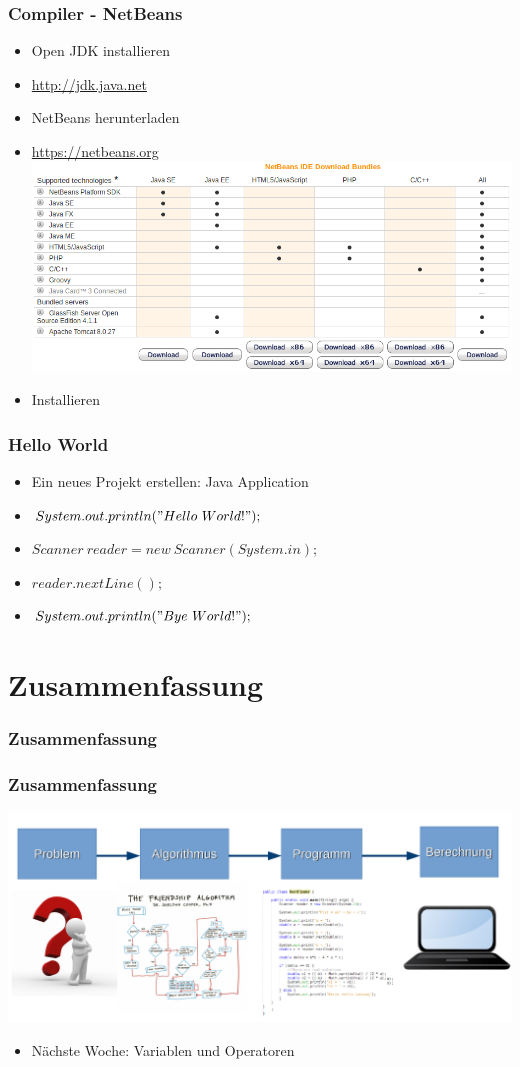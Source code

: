 \documentclass{beamer}
\begin{document}
	\begin{frame}
		\frametitle{Compiler - NetBeans}
		\begin{itemize}
			\item Open JDK installieren
			\item \url{http://jdk.java.net}
			\item NetBeans herunterladen
			\item \url{https://netbeans.org} \\
			\includegraphics[width=.5\textwidth]{Netbeans-Download}
			\item Installieren
		\end{itemize}
	\end{frame}

	\begin{frame}
		\frametitle{Hello World}
		\begin{itemize}
			\item Ein neues Projekt erstellen: Java Application
			\item $System.out.println("Hello\ World!");$
			\pause
			\item $Scanner\ reader = new\ Scanner(System.in);$
			\item $reader.nextLine();$
			\pause
			\item $System.out.println("Bye\ World!");$
		\end{itemize}
	\end{frame}

	\section{Zusammenfassung}
	\begin{frame}
		\frametitle{Zusammenfassung}
	\end{frame}

	\begin{frame}
		\frametitle{Zusammenfassung}
		\includegraphics[width=\textwidth]{Alg-Prog-Schema}
		\begin{itemize}
			\item Nächste Woche: Variablen und Operatoren
		\end{itemize}
	\end{frame}
\end{document}
